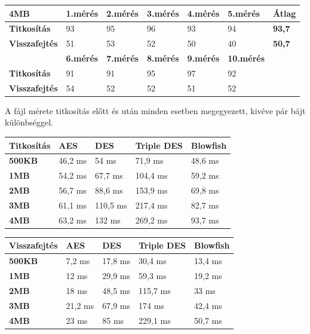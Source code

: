 \begin{center}
	
	
	\begin{tabular}{|p{2.4cm}|p{1.7cm}|p{1.7cm}|p{1.7cm}|p{1.7cm}|p{1.8cm}|p{1.2cm}|}
		\hline
		\textbf{4MB} & \textbf{1.mérés} & \textbf{2.mérés} & \textbf{3.mérés} & \textbf{4.mérés} & \textbf{5.mérés} & \textbf{Átlag} \\
		\hline
		\textbf{Titkosítás}&93&95&96&93&94&\textbf{93,7}\\
		\hline
		\textbf{Visszafejtés}&51&53&52&50&40&\textbf{50,7}\\
		\hline
		& \textbf{6.mérés} & \textbf{7.mérés} & \textbf{8.mérés} & \textbf{9.mérés} & \textbf{10.mérés} & \\
		\hline
		\textbf{Titkosítás}&91&91&95&97&92&\\
		\hline
		\textbf{Visszafejtés}&54&52&52&51&52& \\
		\hline
	\end{tabular}
\end{center}


\newpage \noindent A fájl mérete titkosítás előtt és után minden esetben megegyezett, kivéve pár bájt különbséggel.

\begin{center}
	
	
	\begin{tabular}{|p{2.4cm}|p{2.7cm}|p{2.7cm}|p{2.7cm}|p{2.7cm}|}
		\hline
		\textbf{Titkosítás}& \textbf{AES} & \textbf{DES} & \textbf{Triple DES}  & \textbf{Blowfish} \\
		\hline
		\textbf{500KB}&46,2 ms&54 ms&71,9 ms&48,6 ms \\
		\hline
		\textbf{1MB}&54,2 ms&67,7 ms&104,4 ms&59,2 ms \\
		\hline
		\textbf{2MB}&56,7 ms&88,6 ms&153,9 ms&69,8 ms \\
		\hline
		\textbf{3MB}&61,1 ms&110,5 ms&217,4 ms&82,7 ms \\
		\hline
		\textbf{4MB}&63,2 ms&132 ms&269,2 ms&93,7 ms \\
		\hline
	\end{tabular}
\end{center}


\begin{center}
	
	
	\begin{tabular}{|p{2.4cm}|p{2.7cm}|p{2.7cm}|p{2.7cm}|p{2.7cm}|}
		\hline
		\textbf{Visszafejtés}& \textbf{AES} & \textbf{DES} & \textbf{Triple DES}  & \textbf{Blowfish} \\
		\hline
		\textbf{500KB}&7,2 ms&17,8 ms&30,4 ms&13,4 ms \\
		\hline
		\textbf{1MB}&12 ms&29,9 ms&59,3 ms&19,2 ms \\
		\hline
		\textbf{2MB}&18 ms&48,5 ms&115,7 ms&33 ms \\
		\hline
		\textbf{3MB}&21,2 ms&67,9 ms&174 ms&42,4 ms \\
		\hline
		\textbf{4MB}&23 ms&85 ms&229,1 ms&50,7 ms \\
		\hline
	\end{tabular}
\end{center}


